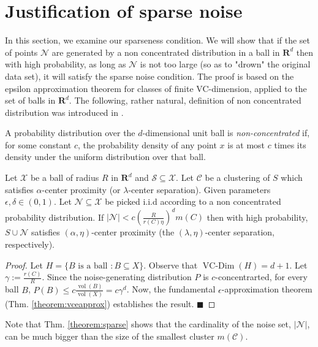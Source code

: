 \documentclass[orivec]{llncs}
\newcommand{\mc}{\mathcal}
\newcommand{\mb}{\mathbf}
\DeclareMathOperator{\vcdim}{VC-Dim}
\DeclareMathOperator{\vol}{vol}
\renewcommand{\qed}{\hfill\ensuremath{\blacksquare}}
\begin{document}
\section{Justification of sparse noise}
\label{Noise_justify}
In this section, we examine our sparseness condition. We will show that if the set of points $\mc N$ are generated by a non concentrated distribution in a ball in $\mb R^d$ then with high probability, as long as $\mc N$ is not too large (so as to "drown" the original data set), it will satisfy the sparse noise condition. The proof is based on the epsilon approximation theorem for classes of finite VC-dimension, applied to the set of balls in $\mb R^d$. The following, rather natural, definition of non concentrated distribution was introduced in \cite{balcan2012distributed}.
\begin{definition} 
A probability distribution over the $d$-dimensional unit ball is \emph{non-concentrated} if, for some constant $c$, the probability density of any point $x$ is at most $c$ times its density under the uniform distribution over that ball.
\end{definition}

\begin{theorem}
\label{theorem:sparse}
Let $\mc X$ be a ball of radius $R$ in $\mb R^d$ and $\mc S \subseteq \mc X$. Let $\mc C$ be a clustering of $S$ which satisfies $\alpha$-center proximity (or $\lambda$-center separation). Given parameters $\epsilon, \delta \in (0,1)$. Let $\mc N \subseteq \mc X$ be picked i.i.d according to a non concentrated probability distribution. If $|\mc N| < c  \left( \frac{R}{r(C) \eta} \right) ^d m(C)$
then with high probability, $S \cup \mc N$  satisfies $(\alpha, \eta)$-center proximity (the $(\lambda, \eta)$-center separation, respectively).
\end{theorem}
\begin{proof}
Let $H = \{B \text{ is a ball }: B \subseteq X\}$. Observe that $\vcdim(H) = d+1$. Let $\gamma := \frac{r(C)}{R}$. Since the noise-generating distribution $P$ is $c$-concentrarted, for every ball $B$, $P(B) \leq c \frac{\vol(B)}{\vol(X)} = c\gamma^d$. Now, the fundamental $\epsilon$-approximation theorem (Thm. \ref{theorem:vceapprox}) establishes the result.
\qed
\end{proof}

\noindent Note that Thm. \ref{theorem:sparse} shows that the cardinality of the noise set, $|\mc N|$, can be much bigger than the size of the smallest cluster $m(\mc C)$. 
\end{document}
